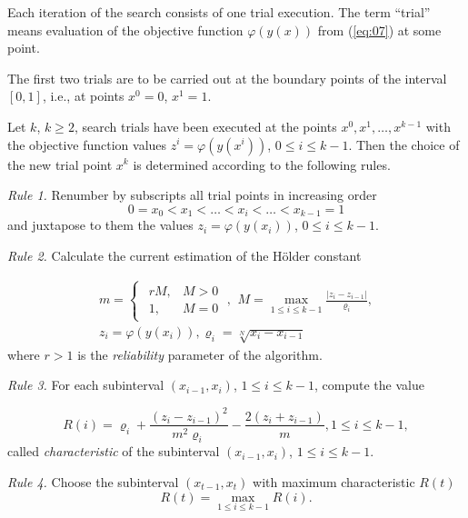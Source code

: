 \documentclass[runningheads]{llncs}
\begin{document}
Each iteration of the search consists of one trial execution. The term ``trial'' means evaluation of the objective function $\varphi(y(x))$ from (\ref{eq:07}) at some point.

The first two trials are to be carried out at the boundary points of the interval $[0,1]$, i.e., at points $x^0=0$, $x^1=1$. 

Let $k$, $k \geq 2$, search trials have been executed at the points $x^0, x^1,\dots,x^{k-1}$ with the objective function values $z^i=\varphi(y(x^i))$, $0 \leq i \leq k-1$. Then the choice of the new trial point $x^k$ is determined according to the following rules.

\textit{Rule 1.} Renumber by subscripts all trial points in increasing order
\begin{equation}
    \label{eq:09}
    0 = x_0 < x_1 < \dots < x_i < \dots < x_{k-1} = 1
\end{equation}
and juxtapose to them the values $z_i=\varphi(y(x_i))$, $0 \leq i \leq k-1$.

\textit{Rule 2.} Calculate the current estimation of the H{\" o}lder constant 

\begin{equation}
    \label{eq:10}
		\begin{matrix}
		m=\begin{cases}
				\begin{matrix}
					 r M, & M >0 \\
					 1, & M = 0 
				\end{matrix} \; , 
			\end{cases}
		M = \max_{1 \leq i \leq k-1} \frac{| z_i - z_{i-1}|}{\varrho_i}, \\
		z_i = \varphi( y(x_i) ), \varrho_i=\sqrt[N]{x_i-x_{i-1}}
		\end{matrix}
\end{equation}
where $r>1$ is the \textit{reliability} parameter of the algorithm.

\textit{Rule 3.} For each subinterval $(x_{i-1} ,x_i)$, $1 \leq i \leq k-1$, compute the value

\begin{equation}
    \label{eq:11}
    R(i) = \varrho_i + \frac{(z_i-z_{i-1})^2}{m^2 \varrho_i} - \frac{2 (z_i+z_{i-1})}{m}, 1 \leq i \leq k-1,
\end{equation}
called \textit{characteristic} of the subinterval $(x_{i-1} ,x_i)$, $1 \leq i \leq k-1$.

\textit{Rule 4.} Choose the subinterval $(x_{t-1} ,x_t)$ with maximum characteristic $R(t)$
\begin{equation}
    \label{eq:12}
    R(t) = \max_{1 \leq i \leq k-1} {R(i)}.
\end{equation}
\end{document}
